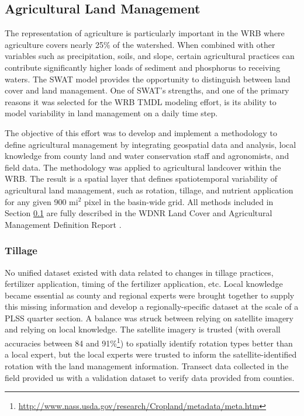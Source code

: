 \subsection{Agricultural Land Management}\label{sec:ag_land_mgt}
The representation of agriculture is particularly important in the WRB where agriculture covers nearly
25\% of the watershed. When combined with other variables such as precipitation, soils,
and slope, certain agricultural practices can contribute significantly higher loads of sediment and phosphorus to receiving waters.  The SWAT model provides the opportunity to distinguish between land cover and land management.  One of SWAT’s strengths, and one of the primary reasons it was selected for the WRB TMDL modeling effort, is its ability to model variability in land management on a daily time step.

The objective of this effort was to develop and implement a methodology to define agricultural management by integrating geospatial data and analysis, local knowledge from county land and water conservation staff and agronomists, and field data. The methodology was applied to agricultural landcover within the WRB. The result is a spatial layer that defines spatiotemporal variability of agricultural land management, such as rotation, tillage, and nutrient application for any given 900 mi$^2$ pixel in the basin-wide grid. All methods included in Section \ref{sec:ag_land_mgt} are fully described in the WDNR Land Cover and Agricultural Management Definition Report .

\subsubsection{Tillage}

No unified dataset existed with data related to changes in tillage practices, fertilizer application, timing of the fertilizer application, etc.  Local knowledge became essential as county and regional experts were brought together to supply this missing information and develop a regionally-specific dataset at the scale of a PLSS quarter section. A balance was struck between relying on satellite imagery and relying on local knowledge. The satellite imagery is trusted (with overall accuracies between  84 and 91\%\footnote{\url{http://www.nass.usda.gov/research/Cropland/metadata/meta.htm}}) to spatially identify rotation types better than a local expert, but the local experts were trusted to inform the satellite-identified rotation with the land management information. Transect data collected in the field provided us with a validation dataset to verify data provided from counties.

